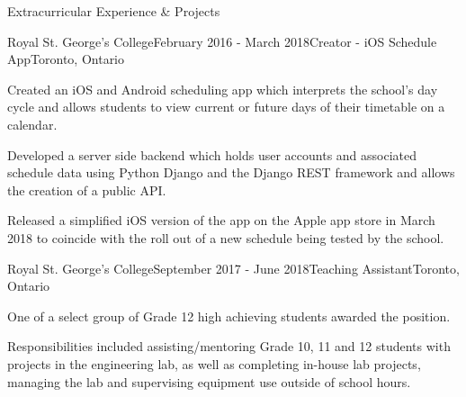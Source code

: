 \documentclass{resume} %
\begin{document}
\begin{rSection}{Extracurricular Experience \& Projects}
\begin{rSubsection}{Royal St. George's College}{February 2016 - March
    2018}{Creator - iOS Schedule App}{Toronto, Ontario}
\item Created an iOS and Android scheduling app which interprets the school’s day cycle and
  allows students to view current or future days of their timetable on a calendar.
\item Developed a server side backend which holds user accounts and associated schedule data
  using Python Django and the Django REST framework and allows the creation of a public
  API.
\item Released a simplified iOS version of the app on the Apple app store in March 2018 to
  coincide with the roll out of a new schedule being tested by the school.

\end{rSubsection}

\begin{rSubsection}{Royal St. George's College}{September 2017 - June
    2018}{Teaching Assistant}{Toronto, Ontario}
\item One of a select group of Grade 12 high achieving students awarded the position.
\item Responsibilities included assisting/mentoring Grade 10, 11 and 12 students with projects in
  the engineering lab, as well as completing in-house lab projects, managing the lab and
  supervising equipment use outside of school hours.
\end{rSubsection}

\end{rSection}
\end{document}
